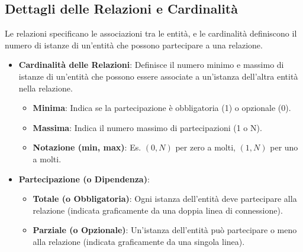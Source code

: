 \subsection{Dettagli delle Relazioni e Cardinalità}
Le relazioni specificano le associazioni tra le entità, e le cardinalità definiscono il numero di istanze di un'entità che possono partecipare a una relazione.
\begin{itemize}
    \item \textbf{Cardinalità delle Relazioni}: Definisce il numero minimo e massimo di istanze di un'entità che possono essere associate a un'istanza dell'altra entità nella relazione.
    \begin{itemize}
        \item \textbf{Minima}: Indica se la partecipazione è obbligatoria (1) o opzionale (0).
        \item \textbf{Massima}: Indica il numero massimo di partecipazioni (1 o N).
        \item \textbf{Notazione (min, max)}: Es. $(0, N)$ per zero a molti, $(1, N)$ per uno a molti.
    \end{itemize}
    \item \textbf{Partecipazione (o Dipendenza)}:
    \begin{itemize}
        \item \textbf{Totale (o Obbligatoria)}: Ogni istanza dell'entità deve partecipare alla relazione (indicata graficamente da una doppia linea di connessione).
        \item \textbf{Parziale (o Opzionale)}: Un'istanza dell'entità può partecipare o meno alla relazione (indicata graficamente da una singola linea).
    \end{itemize}
\end{itemize}

